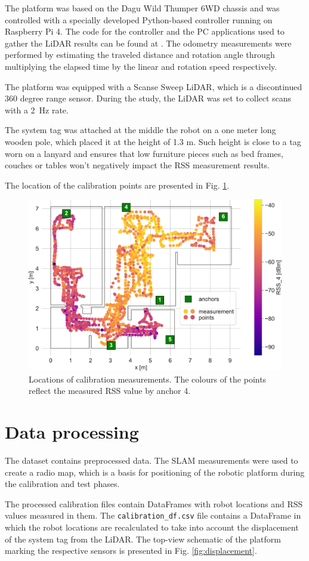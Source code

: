 \documentclass[conference, 11pt, onecolumn]{IEEEtran}
\begin{document}
The platform was based on the Dagu Wild Thumper 6WD chassis and was controlled with a specially developed Python-based controller running on Raspberry Pi 4. The code for the controller and the PC applications used to gather the LiDAR results can be found at \cite{b2}.  The odometry measurements were performed by estimating the traveled distance and rotation angle through multiplying the elapsed time by the linear and rotation speed respectively.

The platform was equipped with a Scanse Sweep LiDAR, which is a discontinued 360 degree range sensor. During the study, the LiDAR was set to collect scans with a 2~Hz rate.

The system tag was attached at the middle the robot on a one meter long wooden pole, which placed it at the height of 1.3 m. Such height is close to a tag worn on a lanyard and ensures that low furniture pieces such as bed frames, couches or tables won't negatively impact the RSS measurement results.

The location of the calibration points are presented in Fig. \ref{fig:calibration}.

\begin{figure}[h]
\centering
\includegraphics[width=.7\columnwidth]{figs/measurement_points}
\caption{\label{fig:calibration}Locations of calibration measurements. The colours of the points reflect the measured RSS value by anchor 4.}
\end{figure}

\section{Data processing}
The dataset contains preprocessed data. The SLAM measurements were used to create a radio map, which is a basis for positioning of the robotic platform during the calibration and test phases.

The processed calibration files contain DataFrames with robot locations and RSS values measured in them. The \texttt{calibration\_df.csv} file contains a DataFrame in which the robot locations are recalculated to take into account the displacement of the system tag from the LiDAR. The top-view schematic of the platform marking the respective sensors is presented in Fig. \ref{fig:displacement}.
\end{document}
